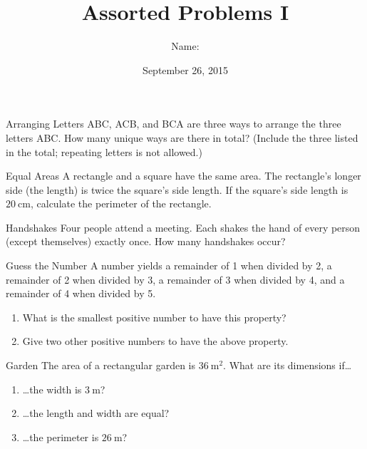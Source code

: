 \documentclass[12pt,letterpaper]{article}
\title{Assorted Problems I}
\author{Name: \underline{\hspace{5cm}}}
\date{September 26, 2015}
\begin{document}
\maketitle

\thispagestyle{empty}

\begin{problem}{Arranging Letters}
 ABC, ACB, and BCA are three ways to arrange the three letters ABC. How many
 unique ways are there in total? (Include the three listed in the total;
 repeating letters is not allowed.)
\end{problem}

\begin{problem}{Equal Areas}
 A rectangle and a square have the same area. The rectangle's longer side (the
 length) is twice the square's side length. If the square's side length is
 $20~\mathrm{cm}$, calculate the perimeter of the rectangle.
\end{problem}

\begin{problem}{Handshakes}
 Four people attend a meeting. Each shakes the hand of every person (except
 themselves) exactly once. How many handshakes occur?
\end{problem}

\begin{problem}{Guess the Number}
 A number yields a remainder of 1 when divided by 2, a remainder of 2 when
 divided by 3, a remainder of 3 when divided by 4, and a remainder of 4 when
 divided by 5.

 \begin{enumerate}[\hspace{1cm}a.]
  \item What is the smallest positive number to have this property?
  \item Give two other positive numbers to have the above property.
 \end{enumerate}
\end{problem}

\begin{problem}{Garden}
 The area of a rectangular garden is $36~\mathrm{m^2}$. What are its dimensions
 if\ldots

 \begin{enumerate}[\hspace{1cm}a.]
   \item \ldots{}the width is $3~\mathrm{m}$?
   \item \ldots{}the length and width are equal?
   \item \ldots{}the perimeter is $26~\mathrm{m}$?
 \end{enumerate}
\end{problem}
\end{document}
